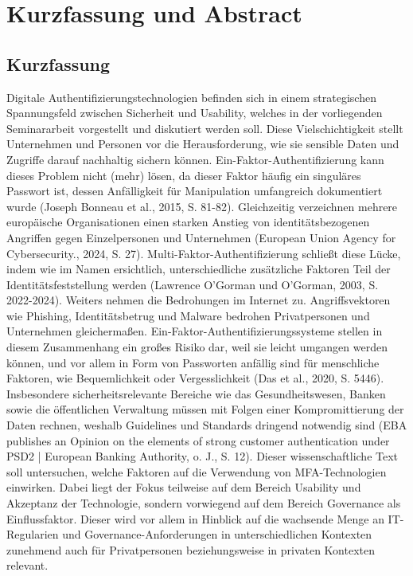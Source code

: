 \section{Kurzfassung und Abstract}
\subsection{Kurzfassung}
Digitale Authentifizierungstechnologien befinden sich in einem strategischen Spannungsfeld zwischen Sicherheit und Usability, welches in der vorliegenden Seminararbeit vorgestellt und diskutiert werden soll.
Diese Vielschichtigkeit stellt Unternehmen und Personen vor die Herausforderung, wie sie sensible Daten und Zugriffe darauf nachhaltig sichern können.
Ein-Faktor-Authentifizierung kann dieses Problem nicht (mehr) lösen, da dieser Faktor häufig ein singuläres Passwort ist, dessen Anfälligkeit für Manipulation umfangreich dokumentiert wurde (Joseph Bonneau et al., 2015, S. 81-82). 
Gleichzeitig verzeichnen mehrere europäische Organisationen einen starken Anstieg von identitätsbezogenen Angriffen gegen Einzelpersonen und Unternehmen (European Union Agency for Cybersecurity., 2024, S. 27).
Multi-Faktor-Authentifizierung schließt diese Lücke, indem wie im Namen ersichtlich, unterschiedliche zusätzliche Faktoren Teil der Identitätsfeststellung werden (Lawrence O'Gorman und O'Gorman, 2003, S. 2022-2024).
Weiters nehmen die Bedrohungen im Internet zu. Angriffsvektoren wie Phishing, Identitätsbetrug und Malware bedrohen Privatpersonen und Unternehmen gleichermaßen.
Ein-Faktor-Authentifizierungssysteme stellen in diesem Zusammenhang ein großes Risiko dar, weil sie leicht umgangen werden können, und vor allem in Form von Passworten anfällig sind für menschliche Faktoren, wie Bequemlichkeit oder Vergesslichkeit (Das et al., 2020, S. 5446).
Insbesondere sicherheitsrelevante Bereiche wie das Gesundheitswesen, Banken sowie die öffentlichen Verwaltung müssen mit Folgen einer Kompromittierung der Daten rechnen, weshalb Guidelines und Standards dringend notwendig sind (EBA publishes an Opinion on the elements of strong customer authentication under PSD2 | European Banking Authority, o. J., S. 12).
Dieser wissenschaftliche Text soll untersuchen, welche Faktoren auf die Verwendung von MFA-Technologien einwirken.
Dabei liegt der Fokus  teilweise auf dem Bereich Usability und Akzeptanz der Technologie, sondern vorwiegend auf dem Bereich Governance als Einflussfaktor.
Dieser wird vor allem in Hinblick auf die wachsende Menge an IT-Regularien und Governance-Anforderungen in unterschiedlichen Kontexten zunehmend auch für Privatpersonen beziehungsweise in privaten Kontexten relevant.  

